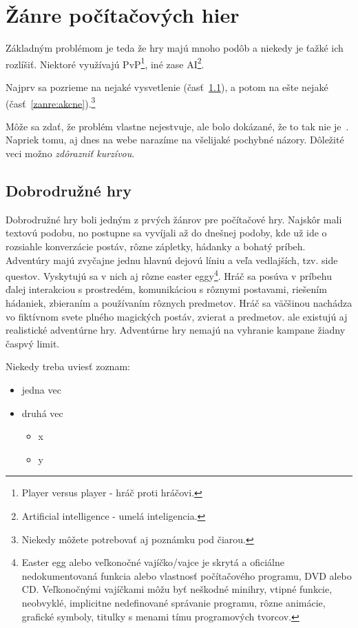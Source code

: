 \documentclass[10pt,twoside,slovak,a4paper]{coursepaper}
\begin{document}
\section{Žánre počítačových hier} \label{zanre}

Základným problémom je teda že hry majú mnoho podôb a niekedy je ťažké ich rozlíšiť. Niektoré využívajú PvP\footnote{Player versus player - hráč proti hráčovi.}, iné zase AI\footnote{Artificial intelligence - umelá inteligencia.}.

Najprv sa pozrieme na nejaké vysvetlenie (časť~\ref{zanre:adventure}), a potom na ešte nejaké (časť~\ref{zanre:akcne}).\footnote{Niekedy môžete potrebovať aj poznámku pod čiarou.}

Môže sa zdať, že problém vlastne nejestvuje\cite{Coplien:MPD}, ale bolo dokázané, že to tak nie je~\cite{Czarnecki:Staged, Czarnecki:Progress}. Napriek tomu, aj dnes na webe narazíme na všelijaké pochybné názory\cite{PLP-Framework}. Dôležité veci možno \emph{zdôrazniť kurzívou}.


\subsection{Dobrodružné hry} \label{zanre:adventure}

Dobrodružné hry boli jedným z prvých žánrov pre počítačové hry. Najskôr mali textovú podobu, no postupne sa vyvíjali až do dnešnej podoby, kde už ide o rozsiahle konverzácie postáv, rôzne zápletky, hádanky a bohatý príbeh. Adventúry majú zvyčajne jednu hlavnú dejovú líniu a veľa vedlajších, tzv. side questov. Vyskytujú sa v nich aj rôzne easter eggy\footnote{Easter egg alebo veľkonočné vajíčko/vajce je skrytá a oficiálne nedokumentovaná funkcia alebo vlastnosť počítačového programu, DVD alebo CD. Veľkonočnými vajíčkami môžu byť neškodné minihry, vtipné funkcie, neobvyklé, implicitne nedefinované správanie programu, rôzne animácie, grafické symboly, titulky s menami tímu programových tvorcov.}. Hráč sa posúva v príbehu ďalej interakciou s prostredém, komunikáciou s rôznymi postavami, riešením hádaniek, zbieraním a používaním rôznych predmetov. Hráč sa väčšinou nachádza vo fiktívnom svete plného magických postáv, zvierat a predmetov. ale existujú aj realistické adventúrne hry. Adventúrne hry nemajú na vyhranie kampane žiadny časpvý limit.


Niekedy treba uviesť zoznam:

\begin{itemize}
\item jedna vec
\item druhá vec
	\begin{itemize}
	\item x
	\item y
	\end{itemize}
\end{itemize}
\end{document}
